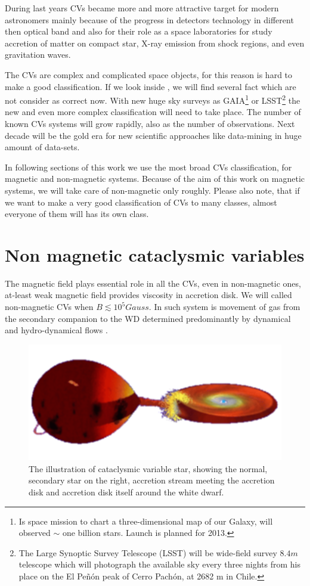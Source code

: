 \documentclass[oneside,a4paper,11pt]{report}
\begin{document}
During last years CVs became more and more attractive target for modern astronomers mainly because of  
the progress in detectors technology in different then optical band and also for their role as a 
space laboratories for study accretion of matter on compact star, X-ray emission from shock regions, 
and even gravitation waves. 

The CVs are complex and complicated space objects, for this reason is hard to make a good 
classification. If we look inside \citet{warner:1}, we will find several fact which are not 
consider as correct now. With new huge sky surveys as GAIA\footnote{Is space mission
to chart a three-dimensional map of our Galaxy, will observed $\sim$ one billion stars. Launch is planned for 2013.} 
or LSST\footnote{The Large Synoptic Survey Telescope (LSST) will be wide-field survey $8.4m$ 
telescope which will photograph the available sky every three nights from his place on the 
El Peñón peak of Cerro Pachón, at 2682 m in Chile. } the new and even more 
complex classification will need to take place.    
The number of known CVs systems will grow rapidly, also as the number of observations. Next decade 
will be the gold era for new scientific approaches like data-mining in huge amount of data-sets.

In following sections of this work we use the most broad CVs classification, for magnetic and non-magnetic
systems. Because of the aim of this work on magnetic systems, we will take care of non-magnetic only  
roughly. Please also note, that if we want to make a very good classification of CVs to many classes, 
almost everyone of them will has its own class.  


  
\section{Non magnetic cataclysmic variables} 
The magnetic field plays essential role in all the CVs, even in non-magnetic ones, at-least weak 
magnetic field provides viscosity in accretion disk. We will called non-magnetic CVs when 
$B\lesssim10^5 Gauss$. 
In such system is movement of gas from the secondary companion to the WD determined predominantly 
by dynamical and hydro-dynamical flows \citet{warner:1}.

\begin{figure}[hbt]
\centering
\includegraphics[totalheight=3cm]{plot/cv}
\caption{The illustration of cataclysmic variable star, showing the normal, secondary star on the right, accretion stream meeting 
the accretion disk and accretion disk itself around the white dwarf. }
\label{cv1} 
\end{figure}
\end{document}
